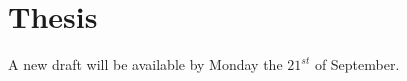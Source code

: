 
\section{Thesis}
\label{sec:thesis}

A new draft will be available by Monday the $21^{st}$ of September.



